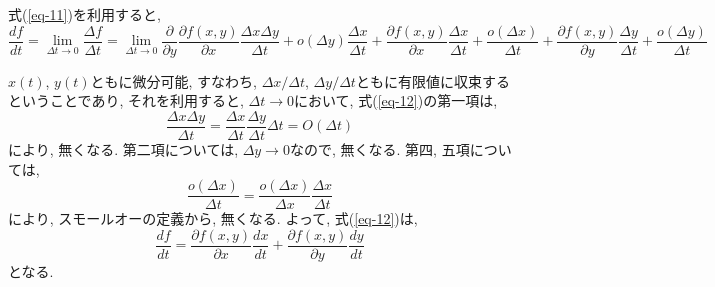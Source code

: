 \documentclass{jsarticle}
\begin{document}
式(\ref{eq-11})を利用すると, 
\begin{equation}\label{eq-12}
  \frac{d f}{d t}
  = \lim_{\Delta t \to 0}\frac{\Delta f}{\Delta t}
  = \lim_{\Delta t \to 0}\frac{\partial}{\partial y}\frac{\partial f(x, y)}{\partial x}\frac{\Delta x \Delta y}{\Delta t}
  + o(\Delta y)\frac{\Delta x}{\Delta t}
  + \frac{\partial f(x, y)}{\partial x}\frac{\Delta x}{\Delta t} 
  + \frac{o(\Delta x)}{\Delta t}
  + \frac{\partial f(x, y)}{\partial y}\frac{\Delta y}{\Delta t}
  + \frac{o(\Delta y)}{\Delta t}
\end{equation}

$x(t)$, $y(t)$ともに微分可能, すなわち, $\Delta x / \Delta t$, $\Delta y / \Delta t$ともに有限値に収束するということであり, それを利用すると, $\Delta t \to 0$において, 
式(\ref{eq-12})の第一項は, 
\[
  \frac{\Delta x \Delta y}{\Delta t} = \frac{\Delta x}{\Delta t} \frac{\Delta y}{\Delta t} \Delta t = O(\Delta t)
\]
により, 無くなる. 
第二項については, $\Delta y \to 0$なので, 無くなる. 
第四, 五項については, 
\[
  \frac{o(\Delta x)}{\Delta t} = \frac{o(\Delta x)}{\Delta x}\frac{\Delta x}{\Delta t}
\]
により, スモールオーの定義から, 無くなる. 
よって, 式(\ref{eq-12})は, 
\begin{equation}
  \frac{d f}{d t} = \frac{\partial f(x, y)}{\partial x}\frac{d x}{d t} + \frac{\partial f(x, y)}{\partial y}\frac{d y}{d t}
\end{equation}
となる. 
\end{document}
